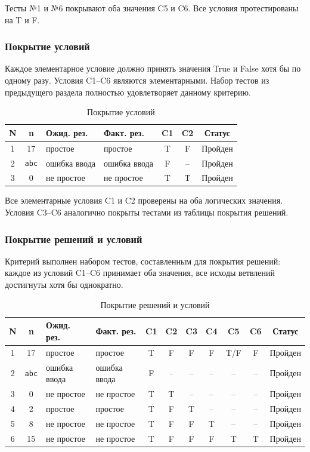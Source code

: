 \documentclass{article}[14pt]
\begin{document}
Тесты №1 и №6 покрывают оба значения C5 и C6. Все условия протестированы на T и F.

\subsubsection{Покрытие условий}

Каждое элементарное условие должно принять значения True и False хотя бы по одному разу.
Условия C1--C6 являются элементарными. Набор тестов из предыдущего раздела полностью
удовлетворяет данному критерию.

\begin{table}[H]
\centering
\caption{Покрытие условий}
\begin{tabularx}{\textwidth}{|c|c|X|X|c|c|c|}
\hline
\textbf{N} & \textbf{n} & \textbf{Ожид. рез.} & \textbf{Факт. рез.} & \textbf{C1} & \textbf{C2} & \textbf{Статус} \\
\hline
1 & 17 & простое & простое & T & F & Пройден \\
\hline
2 & \texttt{abc} & ошибка ввода & ошибка ввода & F & -- & Пройден \\
\hline
3 & 0 & не простое & не простое & T & T & Пройден \\
\hline
\end{tabularx}
\end{table}

Все элементарные условия C1 и C2 проверены на оба логических значения. Условия C3--C6 аналогично покрыты тестами из таблицы покрытия решений.

\subsubsection{Покрытие решений и условий}

Критерий выполнен набором тестов, составленным для покрытия решений: каждое из условий C1--C6
принимает оба значения, все исходы ветвлений достигнуты хотя бы однократно.

\begin{table}[H]
\centering
\caption{Покрытие решений и условий}
\begin{tabularx}{\textwidth}{|c|c|X|X|c|c|c|c|c|c|c|}
\hline
\textbf{N} & \textbf{n} & \textbf{Ожид. рез.} & \textbf{Факт. рез.} & \textbf{C1} & \textbf{C2} & \textbf{C3} & \textbf{C4} & \textbf{C5} & \textbf{C6} & \textbf{Статус} \\
\hline
1 & 17 & простое & простое & T & F & F & F & T/F & F & Пройден \\
\hline
2 & \texttt{abc} & ошибка ввода & ошибка ввода & F & -- & -- & -- & -- & -- & Пройден \\
\hline
3 & 0 & не простое & не простое & T & T & -- & -- & -- & -- & Пройден \\
\hline
4 & 2 & простое & простое & T & F & T & -- & -- & -- & Пройден \\
\hline
5 & 8 & не простое & не простое & T & F & F & T & -- & -- & Пройден \\
\hline
6 & 15 & не простое & не простое & T & F & F & F & T & T & Пройден \\
\hline
\end{tabularx}
\end{table}
\end{document}
